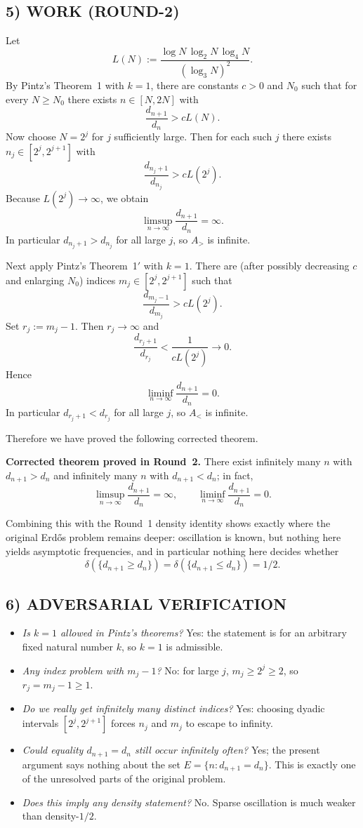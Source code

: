 \subsection*{5) WORK (ROUND-2)}
Let
\[
L(N):=\frac{\log N\,\log_2 N\,\log_4 N}{(\log_3 N)^2}.
\]
By Pintz's Theorem~1 with $k=1$, there are constants $c>0$ and $N_0$ such that for every $N\ge N_0$ there exists $n\in[N,2N]$ with
\[
\frac{d_{n+1}}{d_n}>cL(N).
\]
Now choose $N=2^j$ for $j$ sufficiently large.  Then for each such $j$ there exists $n_j\in[2^j,2^{j+1}]$ with
\[
\frac{d_{n_j+1}}{d_{n_j}}>cL(2^j).
\]
Because $L(2^j)\to\infty$, we obtain
\[
\limsup_{n\to\infty}\frac{d_{n+1}}{d_n}=\infty.
\]
In particular $d_{n_j+1}>d_{n_j}$ for all large $j$, so $A_{>}$ is infinite.

Next apply Pintz's Theorem~1$'$ with $k=1$.  There are (after possibly decreasing $c$ and enlarging $N_0$) indices $m_j\in[2^j,2^{j+1}]$ such that
\[
\frac{d_{m_j-1}}{d_{m_j}}>cL(2^j).
\]
Set $r_j:=m_j-1$.  Then $r_j\to\infty$ and
\[
\frac{d_{r_j+1}}{d_{r_j}}<\frac{1}{cL(2^j)}\longrightarrow 0.
\]
Hence
\[
\liminf_{n\to\infty}\frac{d_{n+1}}{d_n}=0.
\]
In particular $d_{r_j+1}<d_{r_j}$ for all large $j$, so $A_{<}$ is infinite.

Therefore we have proved the following corrected theorem.

\medskip
\noindent\textbf{Corrected theorem proved in Round~2.}
There exist infinitely many $n$ with $d_{n+1}>d_n$ and infinitely many $n$ with $d_{n+1}<d_n$; in fact,
\[
\limsup_{n\to\infty}\frac{d_{n+1}}{d_n}=\infty,
\qquad
\liminf_{n\to\infty}\frac{d_{n+1}}{d_n}=0.
\]

Combining this with the Round~1 density identity shows exactly where the original Erd\H{o}s problem remains deeper: oscillation is known, but nothing here yields asymptotic frequencies, and in particular nothing here decides whether
\[
\delta(\{d_{n+1}\ge d_n\})=\delta(\{d_{n+1}\le d_n\})=1/2.
\]

\subsection*{6) ADVERSARIAL VERIFICATION}
\begin{itemize}
\item \emph{Is $k=1$ allowed in Pintz's theorems?} Yes: the statement is for an arbitrary fixed natural number $k$, so $k=1$ is admissible.
\item \emph{Any index problem with $m_j-1$?} No: for large $j$, $m_j\ge 2^j\ge 2$, so $r_j=m_j-1\ge 1$.
\item \emph{Do we really get infinitely many distinct indices?} Yes: choosing dyadic intervals $[2^j,2^{j+1}]$ forces $n_j$ and $m_j$ to escape to infinity.
\item \emph{Could equality $d_{n+1}=d_n$ still occur infinitely often?} Yes; the present argument says nothing about the set $E=\{n:d_{n+1}=d_n\}$.  This is exactly one of the unresolved parts of the original problem.
\item \emph{Does this imply any density statement?} No.  Sparse oscillation is much weaker than density-$1/2$.
\end{itemize}

